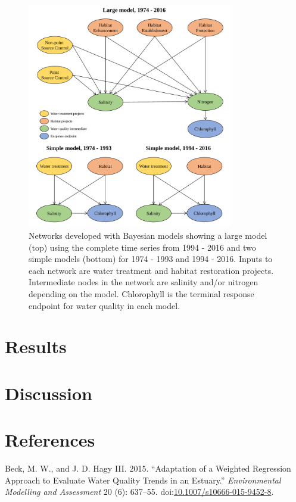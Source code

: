 \documentclass[]{article}
\begin{document}
\begin{figure}
\centerline{\includegraphics[width = 0.8\textwidth]{figs/flow_chrts.pdf}}
\caption{Networks developed with Bayesian models showing a large model (top) using the complete time series from 1994 - 2016 and two simple models (bottom) for 1974 - 1993 and 1994 - 2016. Inputs to each network are water treatment and habitat restoration projects.  Intermediate nodes in the network are salinity and/or nitrogen depending on the model.  Chlorophyll is the terminal response endpoint for water quality in each model.}
\label{fig:bys_flo}
\end{figure}

\section{Results}\label{results}

\section{Discussion}\label{discussion}

\section*{References}\label{references}

\hypertarget{refs}{}
\hypertarget{ref-Beck15}{}
Beck, M. W., and J. D. Hagy III. 2015. ``Adaptation of a Weighted
Regression Approach to Evaluate Water Quality Trends in an Estuary.''
\emph{Environmental Modelling and Assessment} 20 (6): 637--55.
doi:\href{https://doi.org/10.1007/s10666-015-9452-8}{10.1007/s10666-015-9452-8}.
\end{document}
